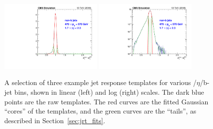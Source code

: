 \begin{figure}[htbp]
\begin{center}
    \includegraphics[width=0.45\textwidth]{figs/jetmet/pt10_eta06_nonbjets_lin.pdf}
    \includegraphics[width=0.45\textwidth]{figs/jetmet/pt10_eta06_nonbjets_log.pdf} \\
    \caption{A selection of three example jet response templates for various \pt/$\eta$/b-jet bins, shown in linear (left) and log (right) scales.
    The dark blue points are the raw templates. The red curves are the fitted Gaussian ``cores'' of the templates, and the green
    curves are the ``tails'', as described in Section~\ref{sec:jrt_fits}.
           }
    \label{fig:jrt_examples}
  \end{center}
\end{figure}

